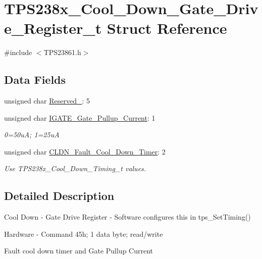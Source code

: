 \hypertarget{struct_t_p_s238x___cool___down___gate___drive___register__t}{\section{T\-P\-S238x\-\_\-\-Cool\-\_\-\-Down\-\_\-\-Gate\-\_\-\-Drive\-\_\-\-Register\-\_\-t Struct Reference}
\label{struct_t_p_s238x___cool___down___gate___drive___register__t}
}


{\ttfamily \#include $<$T\-P\-S23861.\-h$>$}

\subsection*{Data Fields}
\begin{DoxyCompactItemize}
\item 
unsigned char \hyperlink{struct_t_p_s238x___cool___down___gate___drive___register__t_ae9f0d451d6ad80a30efbf93d1e2d0a24}{Reserved\-\_}\-: 5
\item 
unsigned char \hyperlink{struct_t_p_s238x___cool___down___gate___drive___register__t_a846ef11bf527739347db521db4327098}{I\-G\-A\-T\-E\-\_\-\-Gate\-\_\-\-Pullup\-\_\-\-Current}\-: 1
\begin{DoxyCompactList}\small\item\em 0=50u\-A; 1=25u\-A \end{DoxyCompactList}\item 
unsigned char \hyperlink{struct_t_p_s238x___cool___down___gate___drive___register__t_a6aded84bda25360ffdf3a1b82a299de4}{C\-L\-D\-N\-\_\-\-Fault\-\_\-\-Cool\-\_\-\-Down\-\_\-\-Timer}\-: 2
\begin{DoxyCompactList}\small\item\em Use T\-P\-S238x\-\_\-\-Cool\-\_\-\-Down\-\_\-\-Timing\-\_\-t values. \end{DoxyCompactList}\end{DoxyCompactItemize}


\subsection{Detailed Description}
Cool Down -\/ Gate Drive Register -\/ Software configures this in tps\-\_\-\-Set\-Timing() \par
 Hardware -\/ Command 45h; 1 data byte; read/write \par
\par
 Fault cool down timer and Gate Pullup Current 

